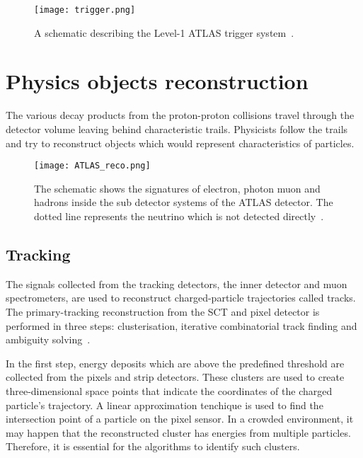 \begin{figure}[htbp]
    \centering
    \texttt{[image: trigger.png]}
    \caption[Sketch of the ATLAS calorimeters]{A schematic describing the Level-1 ATLAS trigger system~\cite{Simioni:2305791}.}%
    \label{fig:trigger}
\end{figure}

\section{Physics objects reconstruction}
\label{sec:ATLASrecon}
The various decay products from the proton-proton collisions travel through the detector volume leaving
behind characteristic trails. Physicists follow the trails and try to reconstruct objects which would 
represent characteristics of particles.

\begin{figure}[htbp]
    \centering
    \texttt{[image: ATLAS\_reco.png]}
    \caption[Sketch of the ATLAS calorimeters]{The schematic shows the signatures of electron, photon
    muon and hadrons inside the sub detector systems of the ATLAS detector. The dotted line represents
    the neutrino which is not detected directly~\cite{Mehlhase:2770815}.}%
    \label{fig:ATLASreco}
\end{figure}

\subsection{Tracking}
The signals collected from the tracking detectors, the inner detector and muon spectrometers, are used to reconstruct charged-particle trajectories called tracks. The primary-tracking
reconstruction from the SCT and pixel detector is performed in three steps: clusterisation, iterative combinatorial track finding and ambiguity solving~\cite{Aaboud_2017}. 

In the first step, energy deposits which are above the predefined threshold are collected from the pixels and strip detectors. These clusters are used to create
three-dimensional space points that indicate the coordinates of the charged particle's trajectory. A linear approximation tenchique is used to find the intersection
point of a particle on the pixel sensor. In a crowded environment, it may happen that the reconstructed cluster has energies from multiple particles. Therefore,
it is essential for the algorithms to identify such clusters. 

